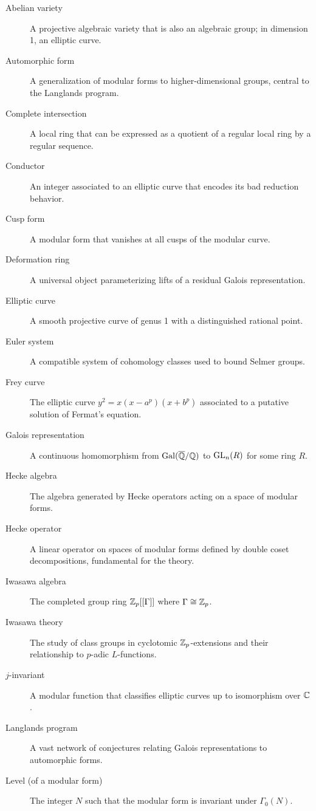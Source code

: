 \begin{description}
    \item[Abelian variety] A projective algebraic variety that is also an algebraic group; in dimension 1, an elliptic curve.
    \item[Automorphic form] A generalization of modular forms to higher-dimensional groups, central to the Langlands program.
    \item[Complete intersection] A local ring that can be expressed as a quotient of a regular local ring by a regular sequence.
    \item[Conductor] An integer associated to an elliptic curve that encodes its bad reduction behavior.
    \item[Cusp form] A modular form that vanishes at all cusps of the modular curve.
    \item[Deformation ring] A universal object parameterizing lifts of a residual Galois representation.
    \item[Elliptic curve] A smooth projective curve of genus 1 with a distinguished rational point.
    \item[Euler system] A compatible system of cohomology classes used to bound Selmer groups.
    \item[Frey curve] The elliptic curve \(y^2 = x(x-a^p)(x+b^p)\) associated to a putative solution of Fermat's equation.
    \item[Galois representation] A continuous homomorphism from \(\operatorname{Gal}(\overline{\mathbb{Q}}/\mathbb{Q})\) to \(\operatorname{GL}_n(R)\) for some ring \(R\).
    \item[Hecke algebra] The algebra generated by Hecke operators acting on a space of modular forms.
    \item[Hecke operator] A linear operator on spaces of modular forms defined by double coset decompositions, fundamental for the theory.
    \item[Iwasawa algebra] The completed group ring \(\mathbb{Z}_p[[\Gamma]]\) where \(\Gamma \cong \mathbb{Z}_p\).
    \item[Iwasawa theory] The study of class groups in cyclotomic \(\mathbb{Z}_p\)-extensions and their relationship to \(p\)-adic \(L\)-functions.
    \item[\(j\)-invariant] A modular function that classifies elliptic curves up to isomorphism over \(\mathbb{C}\).
    \item[Langlands program] A vast network of conjectures relating Galois representations to automorphic forms.
    \item[Level (of a modular form)] The integer \(N\) such that the modular form is invariant under \(\Gamma_0(N)\).

\end{description}
